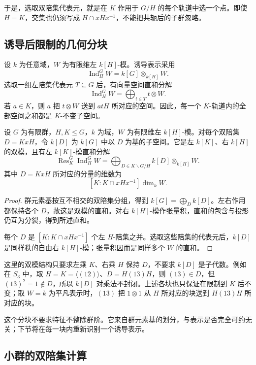 于是，选取双陪集代表元，就是在 \(K\) 作用于 \(G/H\) 的每个轨道中选一个点。即使 \(H=K\)，交集也仍须写成 \(H\cap xHx^{-1}\)，不能把共轭后的子群忽略。

\subsection{诱导后限制的几何分块}
\label{b5:subsec:0401:02}

设 \(k\) 为任意域，\(W\) 为有限维左 \(k[H]\)-模。诱导表示采用
\[
	\operatorname{Ind}_H^G W=k[G]\otimes_{k[H]}W.
\]
选取一组左陪集代表元 \(T\subseteq G\) 后，有向量空间直和分解
\[
	\operatorname{Ind}_H^G W=\bigoplus_{t\in T}t\otimes W.
\]
若 \(a\in K\)，则 \(a\) 把 \(t\otimes W\) 送到 \(atH\) 所对应的空间。因此，每一个 \(K\)-轨道内的全部空间之和都是 \(K\)-不变子空间。

\begin{proposition}\label{b5:prop:double-coset-blocks}
	设 \(G\) 为有限群，\(H,K\leq G\)，\(k\) 为域，\(W\) 为有限维左 \(k[H]\)-模。对每个双陪集 \(D=KxH\)，令 \(k[D]\) 为 \(k[G]\) 中以 \(D\) 为基的子空间。它是左 \(k[K]\)、右 \(k[H]\) 的双模，且有左 \(k[K]\)-模直和分解
	\[
		\operatorname{Res}_K^G\operatorname{Ind}_H^G W =\bigoplus_{D\in K\backslash G/H}k[D]\otimes_{k[H]}W.
	\]
	其中 \(D=KxH\) 所对应的分量的维数为
	\[
		[K:K\cap xHx^{-1}]\dim_k W.
	\]
\end{proposition}
\begin{proof}
	群元素基按互不相交的双陪集分组，得到 \(k[G]=\bigoplus_D k[D]\)。左右作用都保持各个 \(D\)，故这是双模的直和。对右 \(k[H]\)-模作张量积，直和的包含与投影仍互为分裂，得到所述直和。

	每个 \(D\) 是 \([K:K\cap xHx^{-1}]\) 个左 \(H\)-陪集之并。选取这些陪集的代表元后，\(k[D]\) 是同样秩的自由右 \(k[H]\)-模；张量积因而是同样多个 \(W\) 的直和。
\end{proof}

这里的双模结构只要求左乘 \(K\)、右乘 \(H\) 保持 \(D\)，不要求 \(k[D]\) 是子代数。例如在 \(S_3\) 中，取 \(H=K=\langle(12)\rangle\)、\(D=H(13)H\)，则 \((13)\in D\)，但 \((13)^2=1\notin D\)，所以 \(k[D]\) 对乘法不封闭。上述各块也只保证在限制到 \(K\) 后不变；取 \(W=k\) 为平凡表示时，\((13)\) 把 \(1\otimes1\) 从 \(H\) 所对应的块送到 \(H(13)H\) 所对应的块。

\ProseParagraphBreak

这个分块不要求特征不整除群阶。它来自群元素基的划分，与表示是否完全可约无关；下节将在每一块内重新识别一个诱导表示。

\subsection{小群的双陪集计算}
\label{b5:subsec:0401:03}

